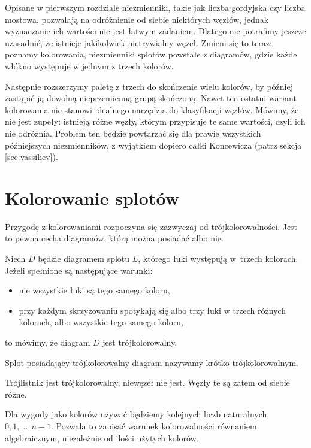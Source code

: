 
Opisane w pierwszym rozdziale niezmienniki, takie jak liczba gordyjska czy liczba mostowa, pozwalają na odróżnienie od siebie niektórych węzłów, jednak wyznaczanie ich wartości nie jest łatwym zadaniem.
Dlatego nie potrafimy jeszcze uzasadnić, że istnieje jakikolwiek nietrywialny węzeł.
Zmieni się to teraz: poznamy kolorowania, niezmienniki splotów powstałe z diagramów, gdzie każde włókno występuje w jednym z trzech kolorów.

Następnie rozszerzymy paletę z trzech do skończenie wielu kolorów, by później zastąpić ją dowolną nieprzemienną grupą skończoną.
Nawet ten ostatni wariant kolorowania nie stanowi idealnego narzędzia do klasyfikacji węzłów.
Mówimy, że nie jest zupeły: istnieją różne węzły, którym przypisuje te same wartości, czyli ich nie odróżnia.
Problem ten będzie powtarzać się dla prawie wszystkich późniejszych niezmienników, z wyjątkiem dopiero całki Koncewicza (patrz sekcja \ref{sec:vassiliev}).

\section{Kolorowanie splotów}
%

Przygodę z kolorowaniami rozpoczyna się zazwyczaj od trójkolorowalności.
Jest to pewna cecha diagramów, którą można posiadać albo nie.

\begin{definition}[trójkolorowalność]
%
    Niech $D$ będzie diagramem splotu $L$, którego łuki występują w~trzech kolorach.
    Jeżeli spełnione są następujące warunki:
    \begin{itemize}[leftmargin=*]
        \item nie wszystkie łuki są tego samego koloru,
        \item przy każdym skrzyżowaniu spotykają się albo trzy łuki w trzech różnych kolorach, albo wszystkie tego samego koloru,
    \end{itemize}
    to mówimy, że diagram $D$ jest trójkolorowalny.
\end{definition}

 Splot posiadający trójkolorowalny diagram nazywamy krótko trójkolorowalnym.

\begin{example}
    Trójlistnik jest trójkolorowalny, niewęzeł nie jest.
    Węzły te są zatem od siebie różne.
\end{example}

Dla wygody jako kolorów używać będziemy kolejnych liczb naturalnych $0, 1, \ldots, n-1$.
Pozwala to zapisać warunek kolorowalności równaniem algebraicznym, niezależnie od ilości użytych kolorów.

